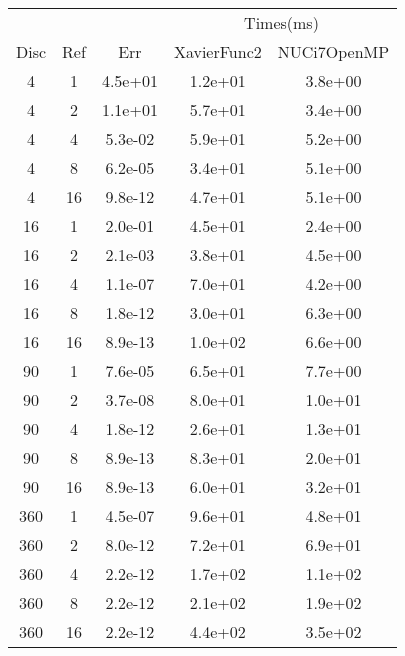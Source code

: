 \begin{center}
  \begin{tabular}{c|c|c|c|c}
      &&&\multicolumn{2}{|c}{Times(ms)}\\
    Disc&Ref&Err&XavierFunc2&NUCi7OpenMP\\
    \hline
    4&1&4.5e+01&1.2e+01&3.8e+00\\
    4&2&1.1e+01&5.7e+01&3.4e+00\\
    4&4&5.3e-02&5.9e+01&5.2e+00\\
    4&8&6.2e-05&3.4e+01&5.1e+00\\
    4&16&9.8e-12&4.7e+01&5.1e+00\\
    \hline
    16&1&2.0e-01&4.5e+01&2.4e+00\\
    16&2&2.1e-03&3.8e+01&4.5e+00\\
    16&4&1.1e-07&7.0e+01&4.2e+00\\
    16&8&1.8e-12&3.0e+01&6.3e+00\\
    16&16&8.9e-13&1.0e+02&6.6e+00\\
    \hline
    90&1&7.6e-05&6.5e+01&7.7e+00\\
    90&2&3.7e-08&8.0e+01&1.0e+01\\
    90&4&1.8e-12&2.6e+01&1.3e+01\\
    90&8&8.9e-13&8.3e+01&2.0e+01\\
    90&16&8.9e-13&6.0e+01&3.2e+01\\
    \hline
    360&1&4.5e-07&9.6e+01&4.8e+01\\
    360&2&8.0e-12&7.2e+01&6.9e+01\\
    360&4&2.2e-12&1.7e+02&1.1e+02\\
    360&8&2.2e-12&2.1e+02&1.9e+02\\
    360&16&2.2e-12&4.4e+02&3.5e+02\\
    \hline
  \end{tabular}
\end{center}







